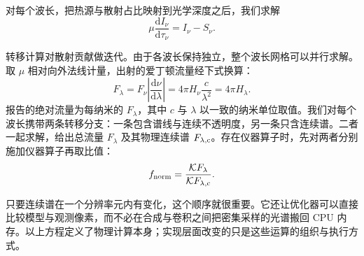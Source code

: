 对每个波长，把热源与散射占比映射到光学深度之后，我们求解
\begin{equation}
\mu\frac{\mathrm{d}I_\nu}{\mathrm{d}\tau_\nu}=I_\nu-S_\nu .
\end{equation}

\noindent 转移计算对散射贡献做迭代。由于各波长保持独立，整个波长网格可以并行求解。取 $\mu$ 相对向外法线计量，出射的爱丁顿流量经下式换算：
\begin{equation}
F_\lambda
=F_\nu\left|\frac{\mathrm{d}\nu}{\mathrm{d}\lambda}\right|
=4\pi H_\nu\frac{c}{\lambda^2}
=4\pi H_\lambda .
\end{equation}
\noindent 报告的绝对流量为每纳米的 $F_\lambda$，其中 $c$ 与 $\lambda$ 以一致的纳米单位取值。我们对每个波长携带两条转移分支：一条包含谱线与连续不透明度，另一条只含连续谱。二者一起求解，给出总流量 $F_\lambda$ 及其物理连续谱 $F_{\lambda,{\rm c}}$。存在仪器算子时，先对两者分别施加仪器算子再取比值：
\begin{equation}
f_{\rm norm} =
\frac{\mathcal{K}F_\lambda}
     {\mathcal{K}F_{\lambda,{\rm c}}} .
\end{equation}

\noindent 只要连续谱在一个分辨率元内有变化，这个顺序就很重要。它还让优化器可以直接比较模型与观测像素，而不必在合成与卷积之间把密集采样的光谱搬回 CPU 内存。以上方程定义了物理计算本身；实现层面改变的只是这些运算的组织与执行方式。

